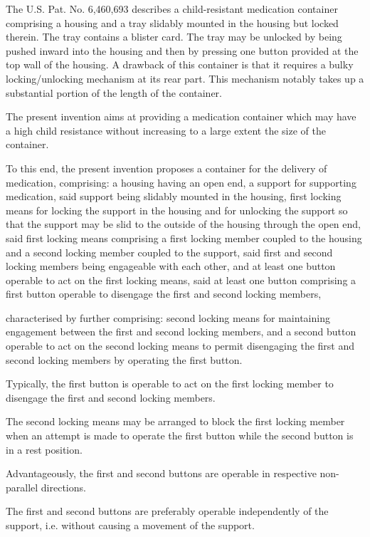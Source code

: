 \documentclass[11pt,a4paper]{article}
\begin{document}
The U.S. Pat. No. 6,460,693 describes a child-resistant medication container comprising a housing and a tray slidably mounted in the housing but locked therein. The tray contains a blister card. The tray may be unlocked by being pushed inward into the housing and then by pressing one button provided at the top wall of the housing. A drawback of this container is that it requires a bulky locking/unlocking mechanism at its rear part. This mechanism notably takes up a substantial portion of the length of the container.

The present invention aims at providing a medication container which may have a high child resistance without increasing to a large extent the size of the container.

To this end, the present invention proposes a container for the delivery of medication, comprising: a housing having an open end, a support for supporting medication, said support being slidably mounted in the housing, first locking means for locking the support in the housing and for unlocking the support so that the support may be slid to the outside of the housing through the open end, said first locking means comprising a first locking member coupled to the housing and a second locking member coupled to the support, said first and second locking members being engageable with each other, and at least one button operable to act on the first locking means, said at least one button comprising a first button operable to disengage the first and second locking members,

characterised by further comprising: second locking means for maintaining engagement between the first and second locking members, and a second button operable to act on the second locking means to permit disengaging the first and second locking members by operating the first button.

Typically, the first button is operable to act on the first locking member to disengage the first and second locking members.

The second locking means may be arranged to block the first locking member when an attempt is made to operate the first button while the second button is in a rest position.

Advantageously, the first and second buttons are operable in respective non-parallel directions.

The first and second buttons are preferably operable independently of the support, i.e. without causing a movement of the support.
\end{document}
